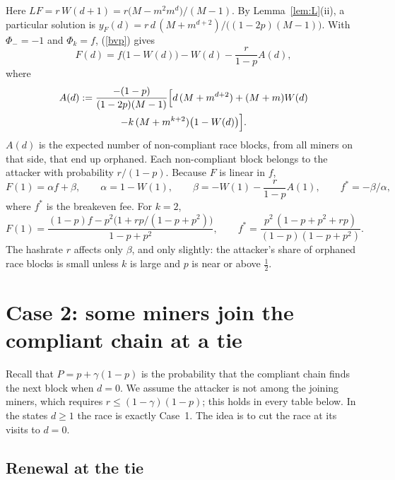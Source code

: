 \documentclass{article}%
\begin{document}
Here $LF=r\,W(d+1)=r\bigl(M-m^{2}m^{d}\bigr)/(M-1)$. By Lemma~\ref{lem:L}(ii),
a particular solution is $y_{F}(d)=r\,d\,(M+m^{d+2})/\bigl((1-2p)(M-1)\bigr)$.
With $\Phi_{-}=-1$ and $\Phi_{k}=f$, (\ref{bvp}) gives%
\begin{equation}
F(d)=f\bigl(1-W(d)\bigr)-W(d)-\frac{r}{1-p}A(d), \label{Fgen}%
\end{equation}
where%
\begin{multline}
A(d):=\frac{-(1-p)}{(1-2p)(M-1)}\Bigl[d\,(M+m^{d+2})+(M+m)W(d)\\
-k\,(M+m^{k+2})\bigl(1-W(d)\bigr)\Bigr]. \label{Agen}%
\end{multline}
$A(d)$ is the expected number of non-compliant race blocks, from all miners
on that side, that end up orphaned. Each non-compliant block belongs to the
attacker with probability $r/(1-p)$. Because $F$ is linear in $f$,
\[
F(1)=\alpha f+\beta,\qquad\alpha=1-W(1),\qquad\beta=-W(1)-\frac{r}{1-p}%
A(1),\qquad f^{\ast}=-\beta/\alpha,
\]
where $f^{\ast}$ is the breakeven fee. For $k=2$,%
\[
F(1)=\frac{(1-p)f-p^{2}\bigl(1+rp/(1-p+p^{2})\bigr)}{1-p+p^{2}},\qquad
f^{\ast}=\frac{p^{2}\,(1-p+p^{2}+rp)}{(1-p)(1-p+p^{2})}.
\]
The hashrate $r$ affects only $\beta$, and only slightly: the attacker's share
of orphaned race blocks is small unless $k$ is large and $p$ is near or above
$\frac{1}{2}$.


\section{Case 2: some miners join the compliant chain at a tie}

Recall that $P=p+\gamma(1-p)$ is the probability that the compliant chain
finds the next block when $d=0$. We assume the attacker is not among the
joining miners, which requires $r\leq(1-\gamma)(1-p)$; this holds in every
table below. In the states $d\geq1$ the race is exactly Case~1. The idea is to
cut the race at its visits to $d=0$.

\subsection{Renewal at the tie}
\end{document}
